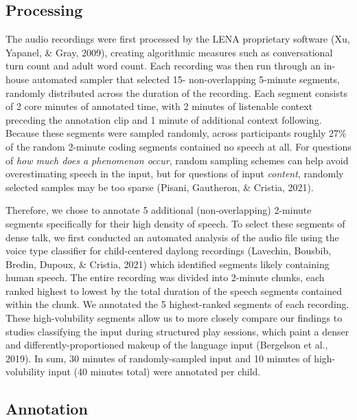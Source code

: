 \documentclass[
  man,floatsintext]{apa6}
\begin{document}
\hypertarget{processing}{%
\subsection{Processing}\label{processing}}

The audio recordings were first processed by the LENA proprietary software (Xu, Yapanel, \& Gray, 2009), creating algorithmic measures such as conversational turn count and adult word count. Each recording was then run through an in-house automated sampler that selected 15- non-overlapping 5-minute segments, randomly distributed across the duration of the recording. Each segment consists of 2 core minutes of annotated time, with 2 minutes of listenable context preceding the annotation clip and 1 minute of additional context following. Because these segments were sampled randomly, across participants roughly 27\% of the random 2-minute coding segments contained no speech at all. For questions of \emph{how much does a phenomenon occur}, random sampling schemes can help avoid overestimating speech in the input, but for questions of input \emph{content}, randomly selected samples may be too sparse (Pisani, Gautheron, \& Cristia, 2021).

Therefore, we chose to annotate 5 additional (non-overlapping) 2-minute segments specifically for their high density of speech. To select these segments of dense talk, we first conducted an automated analysis of the audio file using the voice type classifier for child-centered daylong recordings (Lavechin, Bousbib, Bredin, Dupoux, \& Cristia, 2021) which identified segments likely containing human speech. The entire recording was divided into 2-minute chunks, each ranked highest to lowest by the total duration of the speech segments contained within the chunk. We annotated the 5 highest-ranked segments of each recording. These high-volubility segments allow us to more closely compare our findings to studies classifying the input during structured play sessions, which paint a denser and differently-proportioned makeup of the language input (Bergelson et al., 2019). In sum, 30 minutes of randomly-sampled input and 10 minutes of high-volubility input (40 minutes total) were annotated per child.

\hypertarget{annotation}{%
\subsection{Annotation}\label{annotation}}
\end{document}
